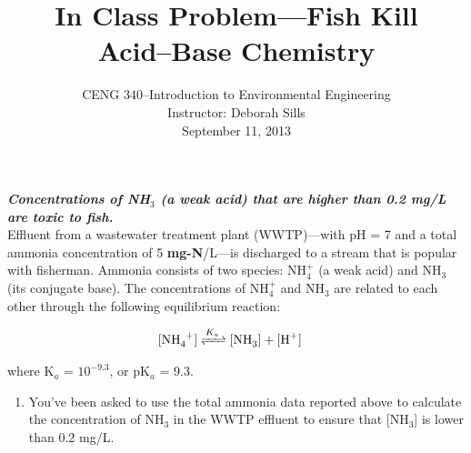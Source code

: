 \documentclass[12pt,letterpaper]{article}
\begin{document}
\setlength{\parindent}{0cm} 


\frenchspacing

\title {In Class Problem---Fish Kill \\ {\Large \textbf{Acid--Base Chemistry}}}
\author {CENG 340--Introduction to Environmental Engineering\\
Instructor: Deborah Sills\\September 11, 2013}
\date {}
\maketitle


\textbf{\emph{Concentrations of NH$_3$ (a weak acid) that are higher than 0.2 mg/L are toxic to fish.}}\\ 

Effluent from a wastewater treatment plant (WWTP)---with pH = 7 and a total ammonia concentration of 5 \textbf{mg-N}/L---is discharged to a stream that is popular with fisherman.  Ammonia consists of two species: NH$_4^+$ (a weak acid) and  NH$_3$ (its conjugate base). The concentrations of NH$_4^+$ and NH$_3$ are related to each other through the following equilibrium reaction:

\begin{align*}
\cee{[NH_4^+] &<=>[K_a] [NH_3] + [H^+]}
\end{align*}

where K$_a$ = $10^{-9.3}$, or pK$_a$ = 9.3.

\begin{enumerate}

\item  You've been asked to use the total ammonia data reported above to calculate the concentration of NH$_3$ in the WWTP effluent to ensure that [NH$_3$] is lower than 0.2 mg/L.



\end{enumerate}
\end{document}
